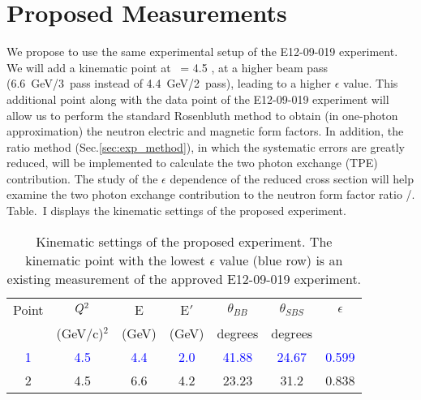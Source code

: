\section{Proposed Measurements} 
\label{prop}

We propose to use the same experimental setup of the E12-09-019 experiment. We will add a kinematic point at \qsq~= 4.5 \gevcsq, at a higher beam pass (6.6~GeV/3~pass instead of 4.4~GeV/2~pass), leading to a higher $\epsilon$ value. This additional point along with the data point of the E12-09-019 experiment will allow us to perform the standard Rosenbluth method to obtain (in one-photon approximation) the neutron electric and magnetic form factors. In addition, the ratio method (Sec.\ref{sec:exp_method}), in which the systematic errors are greatly reduced, will be implemented to calculate  the two photon exchange (TPE) contribution. The study of the $\epsilon$ dependence of the reduced cross section will help examine the two photon exchange contribution to the neutron form factor ratio \gen/\gmn. Table.~I displays the kinematic settings of the proposed experiment. 

\begin{table}[h] 
\centering
\begin{tabular}{|c|c|c|c|c|c|c|}
\hline
\small{Point} & $Q\textsuperscript{2}$  & E & E$'$  & $\theta_{BB}$ & $\theta_{SBS}$ & $\epsilon$ \\
& (GeV/c)$^2$ & (GeV) & (GeV)  &\; degrees\; & \; degrees \;  &   \\
\hline
\textcolor{blue}
 1&\textcolor{blue} {4.5} & \textcolor{blue}{4.4} & \textcolor{blue}{2.0} & \textcolor{blue}{41.88}  & \textcolor{blue}{24.67} &\; \textcolor{blue}{0.599} \;\\
\hline
2 & 4.5  &  6.6  &  4.2  & 23.23  &  31.2  &  0.838 \\
\hline
\end{tabular} 
\caption{Kinematic settings of the proposed experiment. The kinematic point with the lowest $\epsilon$ value (blue row) is an existing measurement of the approved  E12-09-019 experiment.}
\label{tab:propkin}
\end{table}

